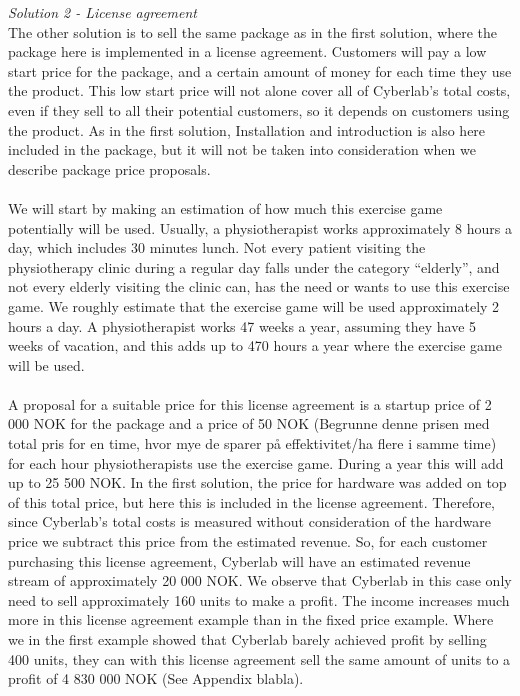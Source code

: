 \emph{Solution 2 - License agreement}\\
The other solution is to sell the same package as in the first solution, where the package here is implemented in a license agreement. Customers will pay a low start price for the package, and a certain amount of money for each time they use the product. This low start price will not alone cover all of Cyberlab’s total costs, even if they sell to all their potential customers, so it depends on customers using the product. As in the first solution, Installation and introduction is also here included in the package, but it will not be taken into consideration when we describe package price proposals. \\ \\
We will start by making an estimation of how much this exercise game potentially will be used. Usually, a physiotherapist works approximately 8 hours a day, which includes 30 minutes lunch. Not every patient visiting the physiotherapy clinic during a regular day falls under the category “elderly”, and not every elderly visiting the clinic can, has the need or wants to use this exercise game. We roughly estimate that the exercise game will be used approximately 2 hours a day. A physiotherapist works 47 weeks a year, assuming they have 5 weeks of vacation, and this adds up to 470 hours a year where the exercise game will be used.\\ \\
A proposal for a suitable price for this license agreement is a startup price of 2 000 NOK for the package and a price of 50 NOK (Begrunne denne prisen med total pris for en time, hvor mye de sparer p{å} effektivitet/ha flere i samme time) for each hour physiotherapists use the exercise game. During a year this will add up to 25 500 NOK. In the first solution, the price for hardware was added on top of this total price, but here this is included in the license agreement. Therefore, since Cyberlab’s total costs is measured without consideration of the hardware price we subtract this price from the estimated revenue. So, for each customer purchasing this license agreement, Cyberlab will have an estimated revenue stream of approximately 20 000 NOK. We observe that Cyberlab in this case only need to sell approximately 160 units to make a profit. The income increases much more in this license agreement example than in the fixed price example. Where we in the first example showed that Cyberlab barely achieved profit by selling 400 units, they can with this license agreement sell the same amount of units to a profit of 4 830 000 NOK (See Appendix blabla). \\ \\	
